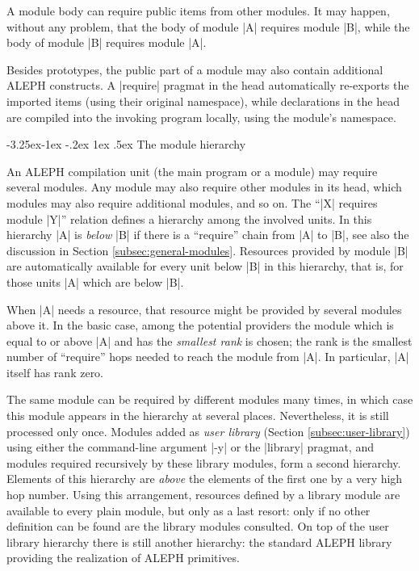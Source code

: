 \documentclass[titlepage]{article}
\makeatletter
\newcommand\A{\textsf{ALEPH}}
\renewcommand\subsection{%
\@startsection{subsection}{2}{\z@}%
   {-3.25ex\@plus -1ex \@minus -.2ex}%
   {1ex \@plus .5ex}%
   {\normalfont\normalsize\bfseries}}
\makeatother
\begin{document}
A module body can require public items from other modules. It may
happen, without any problem, that the body of module \pp|A| requires
module \pp|B|, while the body of module \pp|B| requires module \pp|A|.

Besides prototypes, the public part of a module may also contain additional
\A{} constructs. A \pp|require| pragmat in the head automatically re-exports
the imported items (using their original namespace), while declarations in
the head are compiled into the invoking program locally, using the module's
namespace.


\subsection{The module hierarchy}\label{subsec:hierarchy}

An \A{} compilation unit (the main program or a module) may require several
modules. Any module may also require other modules in its head, which
modules may also require additional modules, and so on. The ``\pp|X|
requires module \pp|Y|'' relation defines a hierarchy among the involved
units. In this hierarchy \pp|A| is \emph{below} \pp|B| if there is a
``require'' chain from \pp|A| to \pp|B|, see also the discussion in Section
\ref{subsec:general-modules}. Resources provided by module \pp|B| are
automatically available for every unit below \pp|B| in this hierarchy, that
is, for those units \pp|A| which are below \pp|B|.

When \pp|A| needs a resource, that resource might be provided by several
modules above it. In the basic case, among the potential providers the module which is
equal to or above \pp|A| and has the \emph{smallest rank} is chosen; the
rank is the smallest number of ``require'' hops needed to reach the module
from \pp|A|. In particular, \pp|A| itself has rank zero.

The same module can be required by different modules many times, in which
case this module appears in the hierarchy at several places. Nevertheless,
it is still processed only once. Modules added as \emph{user library}
(Section \ref{subsec:user-library}) using either the command-line argument
\pp|-y| or the \pp|library| pragmat, and modules required recursively by
these library modules, form a second hierarchy. Elements of this hierarchy
are \emph{above} the elements of the first one by a very high hop number.
Using this arrangement, resources defined by a library module are available
to every plain module, but only as a last resort: only if no other definition can
be found are the library modules consulted. On top of the user
library hierarchy there is still another hierarchy: the standard \A{}
library providing the realization of \A{} primitives.
\end{document}
